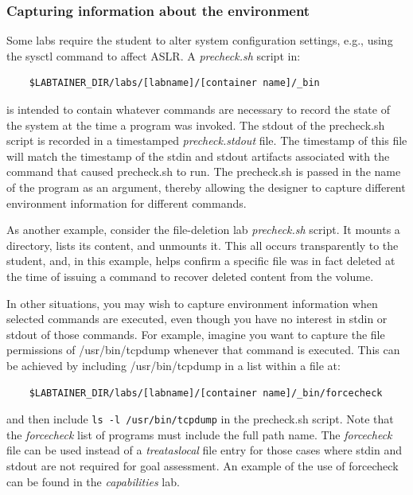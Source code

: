 \documentclass[12pt]{article}
\begin{document}
\subsubsection{Capturing information about the environment}
\label{precheck}
Some labs require the student to alter system configuration settings,
e.g., using the sysctl command to affect ASLR. A \textit{precheck.sh} script in:
\begin{verbatim}
    $LABTAINER_DIR/labs/[labname]/[container name]/_bin
\end{verbatim}
is intended to contain whatever commands are necessary to record the 
state of the system at the time a program was invoked.  The stdout of
the precheck.sh script is recorded in a timestamped \textit{precheck.stdout}
file.  The timestamp of this file will match the timestamp of the stdin and
stdout artifacts associated with the command that caused precheck.sh to run.
The precheck.sh is passed in the name of the program as an argument, thereby
allowing the designer to capture different environment information for different commands.

As another example, consider the file-deletion lab \textit{precheck.sh} script.
It mounts a directory, lists its content, and unmounts it.  This all occurs 
transparently to the student, and, in this example, helps confirm a specific file
was in fact deleted at the time of issuing a command to recover deleted content from
the volume.

In other situations, you may wish to capture environment information when selected
commands are executed, even though you have no interest in stdin or stdout of those
commands.  For example, imagine you want to capture the file permissions of /usr/bin/tcpdump
whenever that command is executed.  This can be achieved by including /usr/bin/tcpdump in a
list within a file at:
\begin{verbatim}
    $LABTAINER_DIR/labs/[labname]/[container name]/_bin/forcecheck
\end{verbatim}
\noindent and then include \texttt{ls -l /usr/bin/tcpdump} in the precheck.sh script.
Note that the \textit{forcecheck} list of programs must include the full path name.
The \textit{forcecheck} file can be used instead of a \textit{treataslocal} file entry
for those cases where stdin and stdout are not required for goal assessment.  An example of the use of
forcecheck can be found in the \textit{capabilities} lab.  
\end{document}
